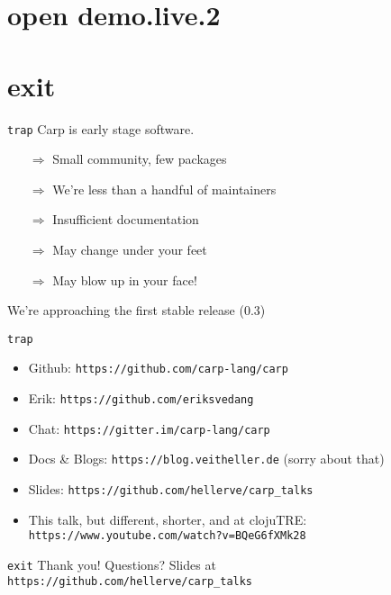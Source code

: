 \documentclass[aspectratio=169]{beamer}
\begin{document}
  \section{open demo.live.2}
  \section{exit}
  \begin{frame}{\texttt{trap}}
    Carp is early stage software.
    \begin{itemize}
      \item[$\Rightarrow$] Small community, few packages
      \item[$\Rightarrow$] We’re less than a handful of maintainers
      \item[$\Rightarrow$] Insufficient documentation
      \item[$\Rightarrow$] May change under your feet
      \item[$\Rightarrow$] May blow up in your face!
    \end{itemize}
    We’re approaching the first stable release (0.3)
  \end{frame}
  \begin{frame}{\texttt{trap}}
    \begin{itemize}
      \item Github: \texttt{https://github.com/carp-lang/carp}
      \item Erik: \texttt{https://github.com/eriksvedang}
      \item Chat: \texttt{https://gitter.im/carp-lang/carp}
      \item Docs \& Blogs: \texttt{https://blog.veitheller.de} (sorry about that)
      \item Slides: \texttt{https://github.com/hellerve/carp\_talks}
      \item This talk, but different, shorter, and at clojuTRE: \texttt{https://www.youtube.com/watch?v=BQeG6fXMk28}
    \end{itemize}
  \end{frame}
  \begin{frame}{\texttt{exit}}
    \Huge Thank you!
    \linebreak
    \linebreak
    \linebreak
    \small Questions?
    \linebreak
    \linebreak
    \tiny Slides at \texttt{https://github.com/hellerve/carp\_talks}
  \end{frame}
\end{document}
